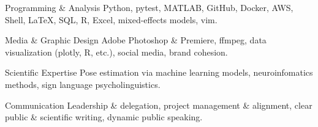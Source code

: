 

\begin{cvskills}

  \cvskill
    {Programming \& Analysis} %
    {Python, pytest, MATLAB, GitHub, Docker, AWS, Shell, \LaTeX, SQL, R, Excel, mixed-effects models, vim.} %

  \cvskill
    {Media \& Graphic Design} %
    {Adobe Photoshop \& Premiere, ffmpeg, data visualization (plotly, R, etc.), social media, brand cohesion.} %

  \cvskill
    {Scientific Expertise} %
    {Pose estimation via machine learning models, neuroinfomatics methods, sign language psycholinguistics.} %

  \cvskill
    {Communication} %
    {Leadership \& delegation, project management \& alignment, clear public \& scientific writing, dynamic public speaking.} %



\end{cvskills}

